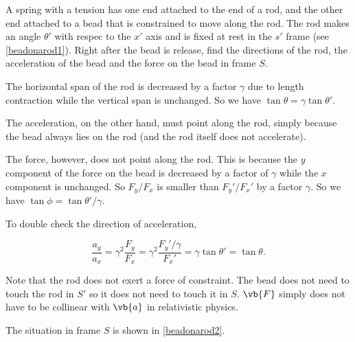 \documentclass[english,a4paper,12pt]{report}
\begin{document}
{A spring with a tension has one end attached to the end of a rod, and the other end attached to a bead that is constrained to move along the rod. The rod makes an angle \(\theta '\) with respec to the \(x'\) axis and is fixed at rest in the \(s'\) frame (see \cref{beadonarod1}). Right after the bead is release, find the directions of the rod, the acceleration of the bead and the force on the bead in frame \(S\).}
{The horizontal span of the rod is decreased by a factor \(\gamma \) due to length contraction while the vertical span is unchanged. So we have \(\tan \theta = \gamma \tan \theta '\). 

The acceleration, on the other hand, must point along the rod, simply because the bead always lies on the rod (and the rod itself does not accelerate). 

The force, however, does not point along the rod. This is because the \(y\) component of the force on the bead is decreased by a factor of \(\gamma \) while the \(x\) component is unchanged. So \(F_{y}/F_{x}   \) is smaller than \(F_{y}'/F_{x}'   \) by a factor \(\gamma \). So we have \(\tan \phi = \tan \theta ' /\gamma  \). 

To double check the direction of acceleration, 

\begin{equation}
    \frac{a_{y} }{a_{x} } = \gamma ^2 \frac{F_{y} }{F_{x} } = \gamma ^2\frac{F_{y}' /\gamma    }{F_{x}' }  = \gamma \tan \theta ' = \tan \theta .  
\end{equation}

Note that the rod does not exert a force of constraint. The bead does not need to touch the rod in \(S'\) so it does not need to touch it in \(S\). \(\vb{F} \) simply does not have to be collinear with \(\vb{a} \) in relativistic physics.  

The situation in frame \(S\) is shown in \cref{beadonarod2}.

} 
\end{document}
